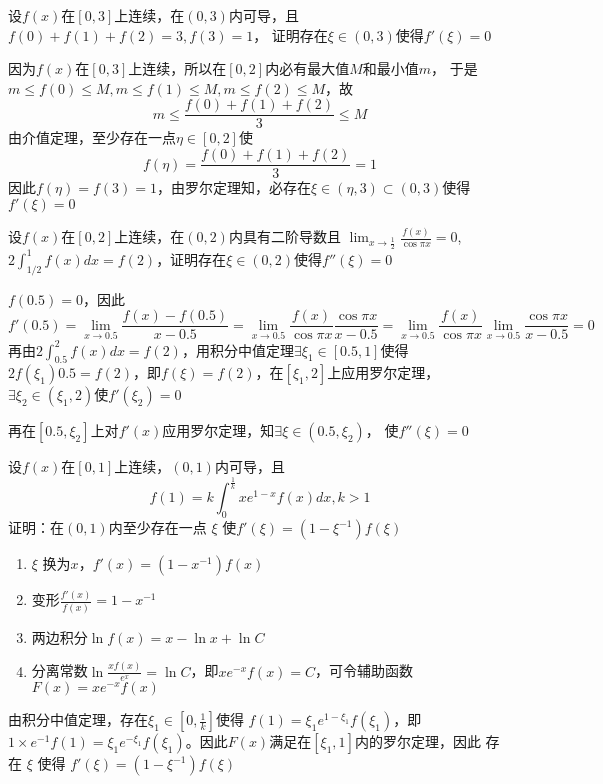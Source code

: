 \documentclass{article}
\begin{document}
\begin{examplle}[]
设\(f(x)\)在\([0,3]\)上连续，在\((0,3)\)内可导，且\(f(0)+f(1)+f(2)=3,f(3)=1\)，
证明存在\(\xi\in(0,3)\)使得\(f'(\xi)=0\)

因为\(f(x)\)在\([0,3]\)上连续，所以在\([0,2]\)内必有最大值\(M\)和最小值\(m\)，
于是\(m\le f(0)\le M,m\le f(1)\le M,m\le f(2)\le M\)，故
\begin{equation*}
m\le\frac{f(0)+f(1)+f(2)}{3}\le M
\end{equation*}
由介值定理，至少存在一点\(\eta\in[0,2]\)使
\begin{equation*}
f(\eta)=\frac{f(0)+f(1)+f(2)}{3}=1
\end{equation*}
因此\(f(\eta)=f(3)=1\)，由罗尔定理知，必存在\(\xi\in(\eta,3)\subset(0,3)\)使得\(f'(\xi)=0\)
\end{examplle}

\begin{examplle}[]
设\(f(x)\)在\([0,2]\)上连续，在\((0,2)\)内具有二阶导数且
\(\displaystyle\lim_{x\to\frac{1}{2}}\frac{f(x)}{\cos\pi x}=0\),
\(2\int_{1/2}^1f(x)dx=f(2)\)，证明存在\(\xi\in(0,2)\)使得\(f''(\xi)=0\)

\(f(0.5)=0\)，因此
\begin{equation*}
f'(0.5)=\lim_{x\to0.5}\frac{f(x)-f(0.5)}{x-0.5}=
\lim_{x\to0.5}\frac{f(x)}{\cos\pi x}\frac{\cos\pi x}{x-0.5}=
\lim_{x\to0.5}\frac{f(x)}{\cos\pi x}\lim_{x\to0.5}\frac{\cos\pi x}{x-0.5}=0
\end{equation*}
再由\(2\int_{0.5}^2f(x)dx=f(2)\)，用积分中值定理\(\exists\xi_1\in[0.5,1]\)使得
\(2f(\xi_1)0.5=f(2)\)，即\(f(\xi)=f(2)\)，在\([\xi_1,2]\)上应用罗尔定理，
\(\exists\xi_2\in(\xi_1,2)\)使\(f'(\xi_2)=0\)

再在\([0.5,\xi_2]\)上对\(f'(x)\)应用罗尔定理，知\(\exists\xi\in(0.5,\xi_2)\)，
使\(f''(\xi)=0\)
\end{examplle}

\begin{examplle}[]
设\(f(x)\)在\([0,1]\)上连续，\((0,1)\)内可导，且
\begin{equation*}
f(1)=k\int_0^{\frac{1}{k}}xe^{1-x}f(x)dx,k>1
\end{equation*}
证明：在\((0,1)\)内至少存在一点 \(\xi\) 使\(f'(\xi)=(1-\xi^{-1})f(\xi)\)

\begin{enumerate}
\item \(\xi\) 换为\(x\)，\(f'(x)=(1-x^{-1})f(x)\)
\item 变形\(\frac{f'(x)}{f(x)}=1-x^{-1}\)
\item 两边积分\(\ln f(x)=x-\ln x+ \ln C\)
\item 分离常数\(\ln\frac{xf(x)}{e^x}=\ln C\)，即\(xe^{-x}f(x)=C\)，可令辅助函数
\(F(x)=xe^{-x}f(x)\)
\end{enumerate}


由积分中值定理，存在\(\xi_1\in[0,\frac{1}{k}]\)使得
\(f(1)=\xi_1e^{1-\xi_1}f(\xi_1)\)，即\(1\times e^{-1}f(1)=\xi_1
  e^{-\xi_1}f(\xi_1)\)。因此\(F(x)\)满足在\([\xi_1,1]\)内的罗尔定理，因此
存在 \(\xi\) 使得 \(f'(\xi)=(1-\xi^{-1})f(\xi)\)
\end{examplle}
\end{document}
